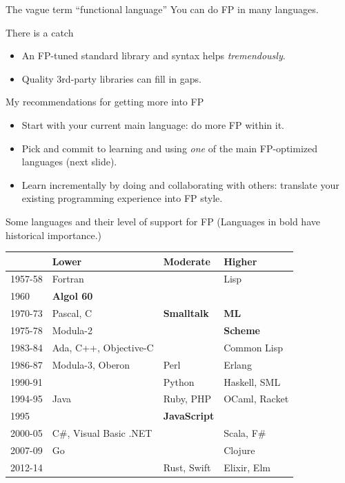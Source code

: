 \begin{frame}{The vague term ``functional language''}
  You can do FP in many languages.

  \begin{alertblock}{There is a catch}
    \begin{itemize}
    \item An FP-tuned standard library and syntax helps \emph{tremendously}.
    \item Quality 3rd-party libraries can fill in gaps.
    \end{itemize}
  \end{alertblock}

  \begin{block}{My recommendations for getting more into FP}
    \begin{itemize}
    \item Start with your current main language: do more FP within
      it.
    \item Pick and commit to learning and using \emph{one} of the
      main FP-optimized languages (next slide).
    \item Learn incrementally by doing and collaborating with others: translate your existing programming experience into FP style.
    \end{itemize}
  \end{block}
\end{frame}

\begin{frame}{Some languages and their level of support for FP}
  (Languages in bold have historical importance.)

  \begin{table}
    \begin{tabular}{| l || l | l | l |}
      \toprule
      & Lower & Moderate & Higher \\
      \midrule
      1957-58 & Fortran & & Lisp \\
      1960 & \textbf{Algol 60} & & \\
      1970-73 & Pascal, C & \textbf{Smalltalk} & \textbf{ML} \\
      1975-78 & Modula-2 & & \textbf{Scheme} \\
      1983-84 & Ada, C++, Objective-C & & Common Lisp \\
      1986-87 & Modula-3, Oberon & Perl & Erlang \\
      1990-91 & & Python & Haskell, SML \\
      1994-95 & Java & Ruby, PHP & OCaml, Racket \\
      1995 & & \textbf{JavaScript} &  \\
      2000-05 & C\#, Visual Basic .NET & & Scala, F\# \\
      2007-09 & Go & & Clojure \\
      2012-14 & & Rust, Swift & Elixir, Elm \\
      \bottomrule
    \end{tabular}
  \end{table}
\end{frame}

